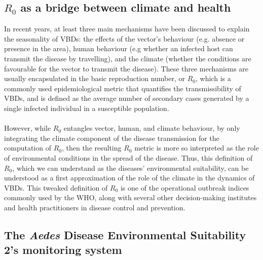 \documentclass[10pt,twocolumn]{wlscirep}
\begin{document}
\subsection{$R_0$ as a bridge between climate and health} \label{sec-methods-redefining-R0}

In recent years, at least three main mechanisms have been discussed to explain the seasonality of VBDs\cite{moriyama_2020}: the effects of the vector's behaviour (e.g. absence or presence in the area), human behaviour (e.g whether an infected host can transmit the disease by travelling), and the climate (whether the conditions are favourable for the vector to transmit the disease). These three mechanisms are usually encapsulated in the basic reproduction number, or $R_0$, which is a commonly used epidemiological metric that quantifies the transmissibility of VBDs, and is defined as the average number of secondary cases generated by a single infected individual in a susceptible population\cite{dietz_1993}.
\\
\\
However, while $R_0$ entangles vector, human, and climate behaviour, by only integrating the climate component of the disease transmission for the computation of $R_0$, then the resulting $R_0$ metric is more so interpreted as the role of environmental conditions in the spread of the disease. Thus, this definition of $R_0$, which we can understand as the diseases' environmental suitability, can be understood as a first approximation of the role of the climate in the dynamics of VBDs. This tweaked definition of $R_0$ is one of the operational outbreak indices commonly used by the WHO, along with several other decision-making institutes and health practitioners in disease control and prevention\cite{OMS_2017, chiew_2014}.


\subsection{The \textit{Aedes} Disease Environmental Suitability 2's monitoring system} \label{sec-methods-aedes2}
\end{document}

